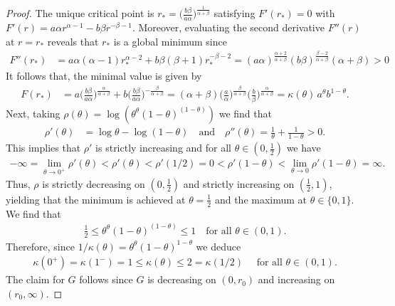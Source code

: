 \documentclass[12pt, reqno]{amsart}%
\theoremstyle{plain}  %
\theoremstyle{definition}  %
\theoremstyle{remark}
\numberwithin{equation}{section}
\begin{document}
\begin{proof}
The unique critical point is $ r_* = \big(\frac{b \beta}{a \alpha}\big)^{\frac{1}{\alpha + \beta}}$ satisfying  $F'(r_*) = 0$ with $F'(r) = a \alpha r^{\alpha - 1} - b \beta r^{-\beta - 1}.$
Moreover, evaluating  the second derivative $F''(r)$  at $r=r_*$ reveals that $r_*$ is a global minimum since
\begin{align*}
F''(r_*)
&= a \alpha (\alpha - 1) r_*^{\alpha - 2} + b \beta (\beta + 1) r_*^{-\beta - 2}
=  (a\alpha)^{\frac{\alpha+2}{\alpha + \beta} } (b\beta)^{\frac{\beta-2}{\alpha + \beta} } (\alpha+\beta)>0
\end{align*}
It follows that, the minimal value is given by
\begin{align*}
F(r_*)
&= a \Big(\frac{b \beta}{a \alpha}\Big)^{\frac{\alpha}{\alpha + \beta}} + b \Big(\frac{b \beta}{a \alpha}\Big)^{-\frac{\beta}{\alpha + \beta}}
=(\alpha + \beta)  \Big(\frac{a}{\alpha}\Big)^{\frac{\beta}{\alpha + \beta}}  \Big(\frac{b }{\beta}\Big)^{\frac{\alpha}{\alpha + \beta}}= \kappa(\theta)\, a^{\theta} b^{1 - \theta}.
\end{align*}
Next,  taking $\rho(\theta)= \log(\theta^{\theta} (1-\theta)^{(1-\theta)})$ we find that
\begin{align*}
\rho'(\theta)
&= \log \theta - \log(1 - \theta) \quad\text{and}\quad
\rho''(\theta) = \frac{1}{\theta} + \frac{1}{1 - \theta}>0.
\end{align*}
This implies that $\rho'$ is strictly increasing and  for all $\theta\in (0, \frac12)$ we have
\begin{align*}
-\infty=\lim_{\theta\to 0^+} \rho' (\theta)< \rho'(\theta)< \rho'(1/2)=0< \rho'(1-\theta)<\lim_{\theta\to 0} \rho' (1-\theta)=\infty.
\end{align*}
Thus,  $\rho$ is strictly decreasing on $(0, \tfrac{1}{2})$ and strictly increasing on $(\tfrac{1}{2}, 1)$, yielding that  the  minimum is achieved at $\theta = \tfrac{1}{2}$  and the maximum at $\theta \in \{0,1\}$. We find that
\begin{align*}
\frac{1}{2}\leq \theta^{\theta} (1-\theta)^{(1-\theta)} \leq 1 \quad \text{for all } \theta \in (0,1).
\end{align*}
Therefore, since $1/\kappa(\theta) =
\theta^{\theta}(1 - \theta)^{1-\theta}$ we deduce
\begin{align*}
\kappa(0^+) =\kappa(1^-) =1\leq \kappa(\theta) \leq 2=\kappa(1/2) \quad \text{ for all }
\theta \in (0,1).
\end{align*}
The claim for $G$ follows since $G$ is decreasing on $(0, r_0)$ and increasing on $(r_0,\infty)$.
\end{proof}
\end{document}
